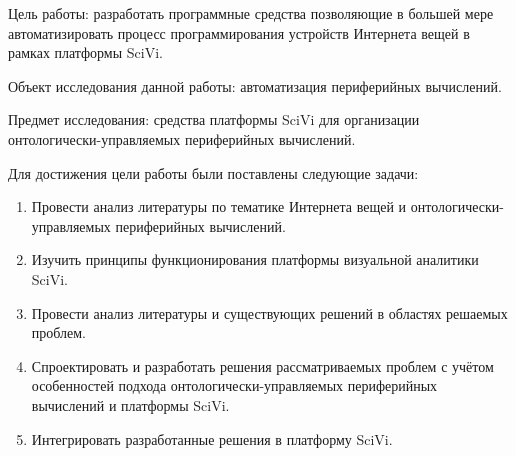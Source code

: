 Цель работы: разработать программные средства позволяющие в большей мере автоматизировать процесс программирования устройств Интернета вещей в рамках платформы SciVi.

Объект исследования данной работы: автоматизация периферийных вычислений.

Предмет исследования: средства платформы SciVi для организации онтологически-управляемых периферийных вычислений.

Для достижения цели работы были поставлены следующие задачи:
\begin{enumerate}
	\item Провести анализ литературы по тематике Интернета вещей и онтологически-управляемых периферийных вычислений.
	\item Изучить принципы функционирования платформы визуальной аналитики SciVi.
	\item Провести анализ литературы и существующих решений в областях решаемых проблем.
	\item Спроектировать и разработать решения рассматриваемых проблем с учётом особенностей подхода онтологически-управляемых периферийных вычислений и платформы SciVi.
	\item Интегрировать разработанные решения в платформу SciVi.
\end{enumerate}
